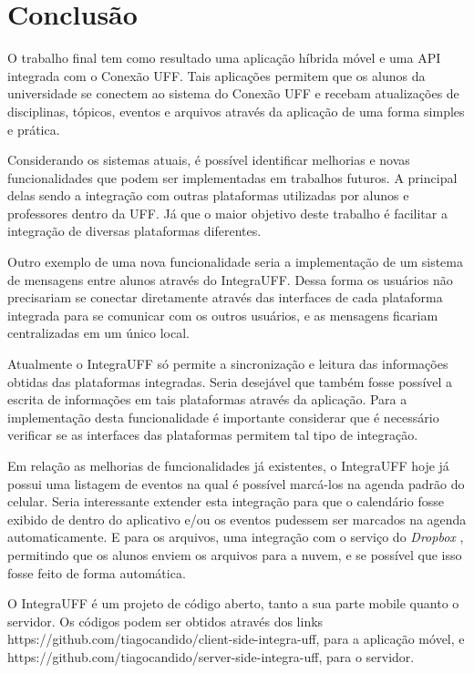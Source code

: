 
\chapter{Conclusão}
\thispagestyle{empty} %

O trabalho final tem como resultado uma aplicação híbrida móvel e uma API integrada com o Conexão UFF. Tais aplicações permitem que os alunos da universidade se conectem ao sistema do Conexão UFF e recebam atualizações de disciplinas, tópicos, eventos e arquivos através da aplicação de uma forma simples e prática.

Considerando os sistemas atuais, é possível identificar melhorias e novas funcionalidades que podem ser implementadas em trabalhos futuros. A principal delas sendo a integração com outras plataformas utilizadas por alunos e professores dentro da UFF. Já que o maior objetivo deste trabalho é facilitar a integração de diversas plataformas diferentes.

Outro exemplo de uma nova funcionalidade seria a implementação de um sistema de mensagens entre alunos através do IntegraUFF. Dessa forma os usuários não precisariam se conectar diretamente através das interfaces de cada plataforma integrada para se comunicar com os outros usuários, e as mensagens ficariam centralizadas em um único local.	

Atualmente o IntegraUFF só permite a sincronização e leitura das informações obtidas das plataformas integradas. Seria desejável que também fosse possível a escrita de informações em tais plataformas através da aplicação. Para a implementação desta funcionalidade é importante considerar que é necessário verificar se as interfaces das plataformas permitem	tal tipo de integração. 

Em relação as melhorias de funcionalidades já existentes, o IntegraUFF hoje já possui uma listagem de eventos na qual é possível marcá-los na agenda padrão do celular. Seria interessante extender esta integração para que o calendário fosse exibido de dentro do aplicativo e/ou os eventos pudessem ser marcados na agenda automaticamente. E para os arquivos, uma integração com o serviço do \textit{Dropbox} \cite{website:dropbox}, permitindo que os alunos enviem os arquivos para a nuvem, e se possível que isso fosse feito de forma automática. 
			
O IntegraUFF é um projeto de código aberto, tanto a sua parte mobile quanto o servidor. Os códigos podem ser obtidos através dos links https://github.com/tiagocandido/client-side-integra-uff, para a aplicação móvel, e https://github.com/tiagocandido/server-side-integra-uff, para o servidor. 		

